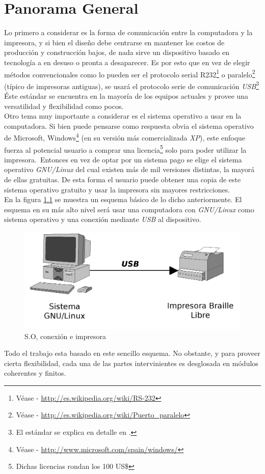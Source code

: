 \chapter{Panorama General}

Lo primero a considerar es la forma de comunicaci\'on entre la computadora y
la impresora, y si bien el dise\~no debe centrarse en mantener los costos de
producci\'on y construcci\'on bajos, de nada sirve un dispositivo basado en
tecnolog\'ia a en desuso o pronta a desaparecer. Es por esto que en vez de
elegir m\'etodos convencionales como lo pueden ser el protocolo serial
R232\footnote{V\'ease - \url{http://es.wikipedia.org/wiki/RS-232}} o
paralelo\footnote{V\'ease - \url{http://es.wikipedia.org/wiki/Puerto_paralelo}}
(t\'ipico de impresoras antiguas), se usar\'a el protocolo serie de
comunicaci\'on \emph{USB}\footnote{El est\'andar se explica en detalle en
.} \'Este est\'andar se encuentra en la mayor\'ia de los
equipos actuales y provee una versatilidad y flexibilidad como pocos.\\

Otro tema muy importante a considerar es el sistema operativo a usar en la
computadora. Si bien puede pensarse como respuesta obvia el sistema operativo
de Microsoft,
Windows\footnote{V\'ease - \url{http://www.microsoft.com/spain/windows/}} (en
su versi\'on m\'as comercializada \emph{XP}), este enfoque fuerza al potencial
usuario a comprar una licencia\footnote{Dichas licencias rondan los 100 US\$}
solo para poder utilizar la impresora.\
Entonces en vez de optar por un sistema pago se elige el sistema
operativo \emph{GNU/Linux}
del cual existen m\'as de mil versiones distintas, la mayor\'a de ellas
gratuitas.
De esta forma el usuario puede obtener una copia de este sistema operativo
gratuito y usar la impresora sin mayores restricciones.\\

En la figura \ref{fig:pc_usb_printer} se muestra un esquema b\'asico de lo
dicho anteriormente. El esquema en su m\'as alto nivel ser\'a usar una
computadora con \emph{GNU/Linux} como sistema operativo y una conexi\'on
mediante \emph{USB} al dispositivo.\\

\begin{figure}[htp]
\centering
\includegraphics[width=13cm]{./img/pc_usb_printer.png}
\caption{S.O, conexi\'on e impresora}
\label{fig:pc_usb_printer}
\end{figure}

Todo el trabajo esta basado en este sencillo esquema. No obstante, y para
proveer cierta flexibilidad, cada una de las partes intervinientes es
desglosada en m\'odulos coherentes y finitos.